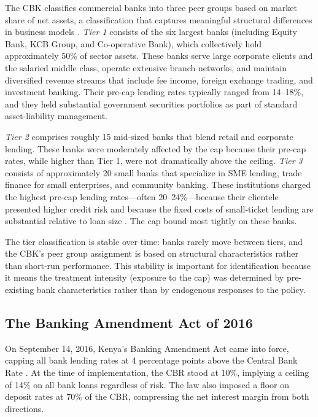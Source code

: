 \documentclass[12pt]{article}
\begin{document}
The CBK classifies commercial banks into three peer groups based on market share of net assets, a classification that captures meaningful structural differences in business models \citep{cbk2017}. \textit{Tier 1} consists of the six largest banks (including Equity Bank, KCB Group, and Co-operative Bank), which collectively hold approximately 50\% of sector assets. These banks serve large corporate clients and the salaried middle class, operate extensive branch networks, and maintain diversified revenue streams that include fee income, foreign exchange trading, and investment banking. Their pre-cap lending rates typically ranged from 14--18\%, and they held substantial government securities portfolios as part of standard asset-liability management.

\textit{Tier 2} comprises roughly 15 mid-sized banks that blend retail and corporate lending. These banks were moderately affected by the cap because their pre-cap rates, while higher than Tier 1, were not dramatically above the ceiling. \textit{Tier 3} consists of approximately 20 small banks that specialize in SME lending, trade finance for small enterprises, and community banking. These institutions charged the highest pre-cap lending rates---often 20--24\%---because their clientele presented higher credit risk and because the fixed costs of small-ticket lending are substantial relative to loan size \citep{stiglitz1981credit, banerjee2013miracle}. The cap bound most tightly on these banks.

The tier classification is stable over time: banks rarely move between tiers, and the CBK's peer group assignment is based on structural characteristics rather than short-run performance. This stability is important for identification because it means the treatment intensity (exposure to the cap) was determined by pre-existing bank characteristics rather than by endogenous responses to the policy.

\subsection{The Banking Amendment Act of 2016}

On September 14, 2016, Kenya's Banking Amendment Act came into force, capping all bank lending rates at 4 percentage points above the Central Bank Rate \citep{were2019effect}. At the time of implementation, the CBR stood at 10\%, implying a ceiling of 14\% on all bank loans regardless of risk. The law also imposed a floor on deposit rates at 70\% of the CBR, compressing the net interest margin from both directions.
\end{document}
